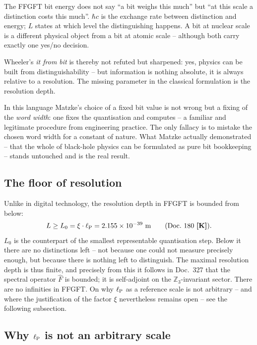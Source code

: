 \begin{tcolorbox}[ffgftbox, title={$\Ebit = \hbar c/L$ is a resolution depth}]
  The FFGFT bit energy does not say \enquote{a bit weighs this much} but
  \enquote{at this scale a distinction costs this much}.
  $\hbar c$ is the exchange rate between distinction and energy;
  $L$ states at which level the distinguishing happens.
  A bit at nuclear scale is a different physical object from a bit at
  atomic scale -- although both carry exactly one yes/no decision.
\end{tcolorbox}

Wheeler's \emph{it from bit} is thereby not refuted but sharpened:
yes, physics can be built from distinguishability -- but information is
nothing absolute, it is always relative to a resolution. The missing
parameter in the classical formulation is the resolution depth.

In this language Matzke's choice of a fixed bit value is not wrong but a
fixing of the \emph{word width}: one fixes the quantisation and computes --
a familiar and legitimate procedure from engineering practice. The only
fallacy is to mistake the chosen word width for a constant of nature.
What Matzke actually demonstrated -- that the whole of black-hole physics
can be formulated as pure bit bookkeeping -- stands untouched and is the
real result.

\subsection{The floor of resolution}

Unlike in digital technology, the resolution depth in FFGFT is bounded
from below:
\begin{equation}
  L \geq L_0 = \xi\cdot\ell_{\mathrm{P}} = 2.155\times10^{-39}~\mathrm{m}
  \qquad \text{(Doc.~180 \textbf{[K]})}.
\end{equation}
$L_0$ is the counterpart of the smallest representable quantisation step.
Below it there are no distinctions left -- not because one could not
measure precisely enough, but because there is nothing left to
distinguish. The maximal resolution depth is thus finite, and precisely
from this it follows in Doc.~327 that the spectral operator $\hat F$ is
bounded; it is self-adjoint on the $\mathbb{Z}_3$-invariant sector. There are no infinities in FFGFT.
On why $\ell_{\mathrm{P}}$ as a reference scale is not arbitrary -- and where the
justification of the factor $\xi$ nevertheless remains open -- see the
following subsection.

\subsection{Why $\ell_{\mathrm{P}}$ is not an arbitrary scale}

